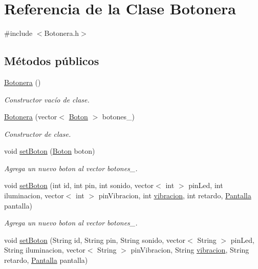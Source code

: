 \hypertarget{classBotonera}{}\section{Referencia de la Clase Botonera}
\label{classBotonera}


{\ttfamily \#include $<$Botonera.\+h$>$}

\subsection*{Métodos públicos}
\begin{DoxyCompactItemize}
\item 
\hyperlink{classBotonera_abb00c73f3c6931fe4d18553c237d1ef1}{Botonera} ()
\begin{DoxyCompactList}\small\item\em Constructor vacío de clase. \end{DoxyCompactList}\item 
\hyperlink{classBotonera_ac1facc00874091d0e825486558b31854}{Botonera} (vector$<$ \hyperlink{classBoton}{Boton} $>$ botones\+\_\+)
\begin{DoxyCompactList}\small\item\em Constructor de clase. \end{DoxyCompactList}\item 
void \hyperlink{classBotonera_ac2128b0f95eb94cb4e5a4302429253b5}{set\+Boton} (\hyperlink{classBoton}{Boton} boton)
\begin{DoxyCompactList}\small\item\em Agrega un nuevo boton al vector botones\+\_\+. \end{DoxyCompactList}\item 
void \hyperlink{classBotonera_a195d5f965e5e924e03d2f9088622b30a}{set\+Boton} (int id, int pin, int sonido, vector$<$ int $>$ pin\+Led, int iluminacion, vector$<$ int $>$ pin\+Vibracion, int \hyperlink{Vibracion_8h_adc29bdc2016021e3f44d420abd54a301}{vibracion}, int retardo, \hyperlink{classPantalla}{Pantalla} pantalla)
\begin{DoxyCompactList}\small\item\em Agrega un nuevo boton al vector botones\+\_\+. \end{DoxyCompactList}\item 
void \hyperlink{classBotonera_a4fbcab2e2721502296c526c6801dcf08}{set\+Boton} (String id, String pin, String sonido, vector$<$ String $>$ pin\+Led, String iluminacion, vector$<$ String $>$ pin\+Vibracion, String \hyperlink{Vibracion_8h_adc29bdc2016021e3f44d420abd54a301}{vibracion}, String retardo, \hyperlink{classPantalla}{Pantalla} pantalla)

\end{DoxyCompactItemize}
